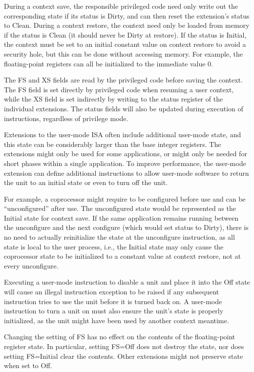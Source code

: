 During a context save, the responsible privileged code need only write
out the corresponding state if its status is Dirty, and can then reset
the extension's status to Clean.  During a context restore, the
context need only be loaded from memory if the status is Clean (it
should never be Dirty at restore).  If the status is Initial, the
context must be set to an initial constant value on context restore to
avoid a security hole, but this can be done without accessing memory.
For example, the floating-point registers can all be initialized to
the immediate value 0.

The FS and XS fields are read by the privileged code before saving the
context.  The FS field is set directly by privileged code when
resuming a user context, while the XS field is set indirectly by
writing to the status register of the individual extensions.  The
status fields will also be updated during execution of instructions,
regardless of privilege mode.

Extensions to the user-mode ISA often include additional user-mode
state, and this state can be considerably larger than the base integer
registers.  The extensions might only be used for some applications,
or might only be needed for short phases within a single application.
To improve performance, the user-mode extension can define additional
instructions to allow user-mode software to return the unit to an
initial state or even to turn off the unit.

For example, a coprocessor might require to be configured before use
and can be ``unconfigured'' after use.  The unconfigured state would
be represented as the Initial state for context save.  If the same
application remains running between the unconfigure and the next
configure (which would set status to Dirty), there is no need to
actually reinitialize the state at the unconfigure instruction, as all
state is local to the user process, i.e., the Initial state may only
cause the coprocessor state to be initialized to a constant value at
context restore, not at every unconfigure.

Executing a user-mode instruction to disable a unit and place it into
the Off state will cause an illegal instruction exception to be raised
if any subsequent instruction tries to use the unit before it is
turned back on.  A user-mode instruction to turn a unit on must also
ensure the unit's state is properly initialized, as the unit might
have been used by another context meantime.

Changing the setting of FS has no effect on the contents of the floating-point
register state.  In particular, setting FS=Off does not destroy the state, nor
does setting FS=Initial clear the contents.  Other extensions might not
preserve state when set to Off.

